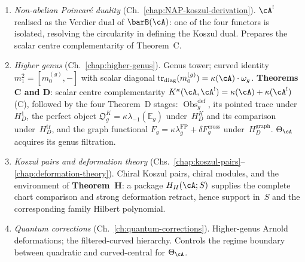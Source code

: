 \begin{enumerate}[label=\textup{\arabic*.}]
\item \emph{Non-abelian Poincar\'e duality}
 (Ch.~\ref{chap:NAP-koszul-derivation}).
 $\cA^!$ realised as the Verdier dual of $\barB(\cA)$: one of the
 four functors is isolated, resolving the circularity in defining
 the Koszul dual. Prepares the scalar centre complementarity of
 Theorem~C.

\item \emph{Higher genus}
 (Ch.~\ref{chap:higher-genus}).
 Genus tower; curved identity $m_1^2=[m_0^{(g)},-]$ with scalar
 diagonal $\operatorname{tr}_{\mathrm{diag}}(m_0^{(g)})
 = \kappa(\cA) \cdot \omega_g$.
 \textbf{Theorems C and D}: scalar centre complementarity
 $K^\kappa(\cA,\cA^!)=\kappa(\cA)+\kappa(\cA^!)$ (C), followed by
 the four Theorem~D stages: $\operatorname{Obs}^{\mathrm{def}}_g$,
 its pointed trace under~$H_D^1$, the perfect object
 $\mathfrak O_g^K=\kappa\lambda_{-1}(\mathbb E_g)$ under~$H_D^K$ and
 its comparison under~$H_D^{\mathrm{tr}}$, and the graph functional
 $F_g=\kappa\lambda_g^{\mathrm{FP}}+\delta F_g^{\mathrm{cross}}$
 under~$H_D^{\mathrm{graph}}$. $\Theta_\cA$ acquires its genus filtration.

\item \emph{Koszul pairs and deformation theory}
 (Chs.~\ref{chap:koszul-pairs}--\ref{chap:deformation-theory}).
 Chiral Koszul pairs, chiral modules, and the environment of
 \textbf{Theorem~H}: a package $H_H(\cA;S)$ supplies the complete
 chart comparison and strong deformation retract, hence support
 in~$S$ and the corresponding family Hilbert polynomial.

\item \emph{Quantum corrections}
 (Ch.~\ref{ch:quantum-corrections}).
 Higher-genus Arnold deformations; the filtered-curved hierarchy.
 Controls the regime boundary between quadratic and curved-central
 for $\Theta_\cA$.
\end{enumerate}

